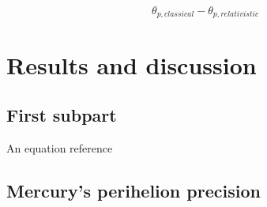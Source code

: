 \documentclass[%
 reprint,
 nobalance,
 amsmath,amssymb,
 aps,
]{revtex4-1}
\begin{document}
\begin{equation}
\theta_{p, classical} - \theta_{p, relativistic}
\end{equation}





\section{Results and discussion}

\subsection{\label{sec:Sub1}First subpart}
An equation reference %



\subsection{\label{sec:Sub2}Mercury's perihelion precision}
\end{document}
